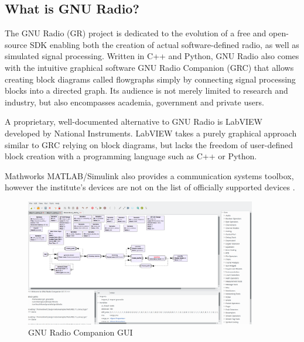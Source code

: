 \subsection{What is GNU Radio?}

\label{sec:gnu-radio}

The GNU Radio (GR) project is dedicated to the evolution of a free and open-source SDK enabling both the creation of actual software-defined radio, as well as simulated signal processing. Written in C++ and Python, GNU Radio also comes with the intuitive graphical software GNU Radio Companion (GRC) that allows creating block diagrams called flowgraphs simply by connecting signal processing blocks into a directed graph. Its audience is not merely limited to research and industry, but also encompasses academia, government and private users.

A proprietary, well-documented alternative to GNU Radio is LabVIEW developed by National Instruments. LabVIEW takes a purely graphical approach similar to GRC relying on block diagrams, but lacks the freedom of user-defined block creation with a programming language such as C++ or Python.

Mathworks MATLAB/Simulink also provides a communication systems toolbox, however the institute's devices are not on the list of officially supported devices \cite{Matlab}.

\begin{figure}[t]
	\label{fig:gnuradio}
	\begin{center}
		\includegraphics[width=0.9\textwidth,valign=c]{pictures/grc_ui}
	\end{center}
	\caption{GNU Radio Companion GUI}
\end{figure}

